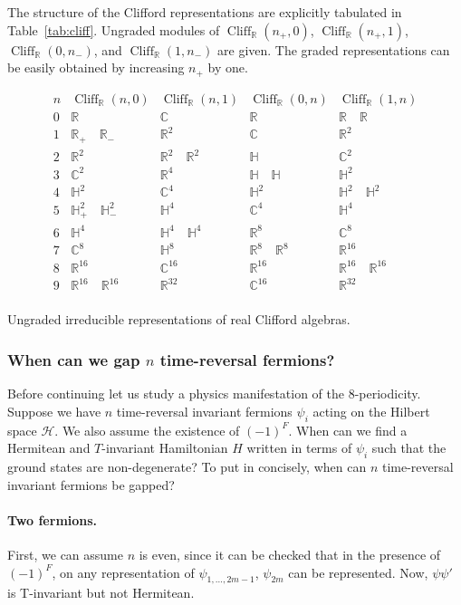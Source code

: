 \documentclass[12pt]{article}
\numberwithin{equation}{section}
\numberwithin{figure}{section}
\theoremstyle{remark}
\renewenvironment{table}[1][]{
  \begin{originaltable}[#1]
    \begin{mdframed}[linecolor=black!0,backgroundcolor=black!1]
}{
    \end{mdframed}
  \end{originaltable}
}
\def\bC{\mathbb{C}}
\def\bH{\mathbb{H}}
\def\bR{\mathbb{R}}
\def\cH{\mathcal{H}}
\def\Cliff{\mathop{\mathrm{Cliff}}\nolimits}
\begin{document}
The structure of the  Clifford representations are explicitly tabulated in Table~\ref{tab:cliff}.
Ungraded modules of $\Cliff_\bR(n_+,0)$,
$\Cliff_\bR(n_+,1)$,
$\Cliff_\bR(0,n_-)$,
and
$\Cliff_\bR(1,n_-)$
are given. The graded representations can be easily obtained by increasing $n_+$ by one.

\begin{table}
\[
\begin{array}{c||c|c||c|c}
n & \Cliff_\bR(n,0) &\Cliff_\bR(n,1) & \Cliff_\bR(0,n) &\Cliff_\bR(1,n)  \\
\hline
0 & \bR &\bC  & \bR & \bR \quad \bR \\
1 & \bR_+\quad \bR_- & \bR^2 & \bC & \bR^2 \\
2 & \bR^2 &\bR^2\quad \bR^2& \bH & \bC^2\\
3 & \bC^2 &\bR^4& \bH\quad\bH & \bH^2 \\
4 & \bH^2 &\bC^4& \bH^2 &\bH^2 \quad \bH^2\\
5& \bH^2_+\quad\bH^2_- &\bH^4& \bC^4  & \bH^4\\
6 & \bH^4 &\bH^4\quad\bH^4& \bR^8 & \bC^8\\
7 & \bC^8 &\bH^8& \bR^8 \quad \bR^8  & \bR^{16}\\
\hline
8 &\bR^{16} &\bC^{16}& \bR^{16} & \bR^{16}\quad \bR^{16}\\
9 &\bR^{16}\quad \bR^{16} &\bR^{32}& \bC^{16} &  \bR^{32}\\
\end{array}
\]
\caption{Ungraded irreducible representations of real Clifford algebras. \label{tab:cliff}}
\end{table}


\subsubsection{When can we gap $n$ time-reversal fermions?}
\label{sec:fk}
Before continuing let us study a physics manifestation of the $8$-periodicity.
Suppose we have $n$ time-reversal invariant fermions $\psi_i$
acting on the Hilbert space $\cH$.
We also assume the existence of $(-1)^F$.
When can we find a Hermitean and $T$-invariant
 Hamiltonian $H$ written in terms of $\psi_i$
such that the ground states are non-degenerate? 
To put in concisely, when can $n$ time-reversal invariant fermions be gapped?

\paragraph{Two fermions.}
First, we can assume $n$ is even,
since it can be checked that in the presence of $(-1)^F$, 
on any representation of $\psi_{1,\ldots, 2m-1}$,
$\psi_{2m}$ can be represented.
Now, $\psi \psi'$ is T-invariant but not Hermitean.
\end{document}
